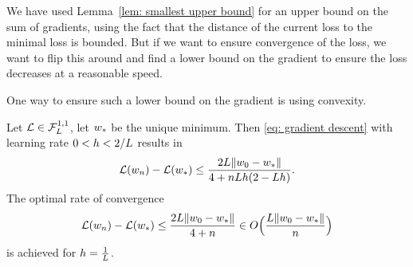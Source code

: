 We have used Lemma~\ref{lem: smallest upper bound} for an upper bound on the
sum of gradients, using the fact that the distance of the current loss to the
minimal loss is bounded. But if we want to ensure convergence of the loss, we
want to flip this around and find a lower bound on the gradient to ensure
the loss decreases at a reasonable speed.

One way to ensure such a lower bound on the gradient is using convexity.

\begin{theorem}
	\label{thm: convex function GD loss upper bound}
	Let \(\mathcal{L}\in\mathcal{F}^{1,1}_{L}\), let \(w_*\) be the unique minimum.
	Then \ref{eq: gradient descent} with learning rate \(0 < h < 2/L\) results in
	\begin{align}\label{eq: convex function loss upper bound}
		\mathcal{L}(w_n) - \mathcal{L}(w_*)
		\le \frac{2L\|w_0 - w_*\|}{4 + nLh(2-Lh)}.
	\end{align}
	The optimal rate of convergence 
	\begin{align*}
		\mathcal{L}(w_n) - \mathcal{L}(w_*)
		\le \frac{2L\|w_0-w_*\|}{4+n}
		\in O\Big(\frac{L\|w_0-w_*\|}{n}\Big)
	\end{align*}
	is achieved for \(h=\tfrac1{L}\).
\end{theorem}
